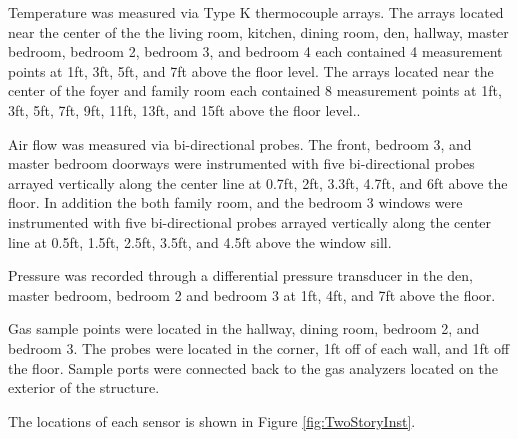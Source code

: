 \documentclass{article}
\begin{document}
Temperature was measured via Type K thermocouple arrays. The arrays located near the center of the the living room, kitchen, dining room, den, hallway, master bedroom, bedroom 2, bedroom 3, and bedroom 4 each contained 4 measurement points at 1ft, 3ft, 5ft, and 7ft above the floor level. The arrays located near the center of the foyer and family room each contained 8 measurement points at 1ft, 3ft, 5ft, 7ft, 9ft, 11ft, 13ft, and 15ft above the floor level..

Air flow was measured via bi-directional probes. The front, bedroom 3, and master bedroom doorways were instrumented with five bi-directional probes arrayed vertically along the center line at 0.7ft, 2ft, 3.3ft, 4.7ft, and 6ft above the floor. In addition the both family room, and the bedroom 3 windows were instrumented with five bi-directional probes arrayed vertically along the center line at 0.5ft, 1.5ft, 2.5ft, 3.5ft, and 4.5ft above the window sill. 

Pressure was recorded through a differential pressure transducer in the den, master bedroom, bedroom 2 and bedroom 3 at 1ft, 4ft, and 7ft above the floor. 

Gas sample points were located in the hallway, dining room, bedroom 2, and bedroom 3. The probes were located in the corner, 1ft off of each wall, and 1ft off the floor. Sample ports were connected back to the gas analyzers located on the exterior of the structure. 

The locations of each sensor is shown in Figure \ref{fig:TwoStoryInst}.
\end{document}
